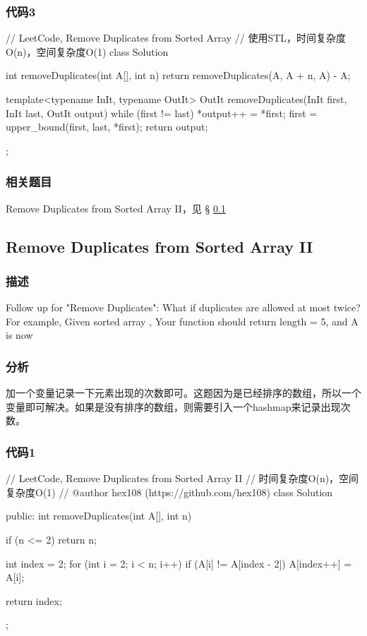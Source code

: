 \subsubsection{代码3}
\begin{Code}
	// LeetCode, Remove Duplicates from Sorted Array
	// 使用STL，时间复杂度O(n)，空间复杂度O(1)
	class Solution {
		int removeDuplicates(int A[], int n) {
			return removeDuplicates(A, A + n, A) - A;
		}
		
		template<typename InIt, typename OutIt>
		OutIt removeDuplicates(InIt first, InIt last, OutIt output) {
			while (first != last) {
				*output++ = *first;
				first = upper_bound(first, last, *first);
			}
			return output;
		}
	};
\end{Code}

\subsubsection{相关题目}

\begindot
\item Remove Duplicates from Sorted Array II，见 \S 
\ref{sec:remove-duplicates-from-sorted-array-ii}
\myenddot


\subsection{Remove Duplicates from Sorted Array II}
\label{sec:remove-duplicates-from-sorted-array-ii}


\subsubsection{描述}
Follow up for "Remove Duplicates":
What if duplicates are allowed at most twice?
For example,
Given sorted array ,
Your function should return length = 5, and A is now \code{[1,1,2,2,3]}

\subsubsection{分析}
加一个变量记录一下元素出现的次数即可。这题因为是已经排序的数组，所以一个变量即可解决。如果是没有排序的数组，则需要引入一个hashmap来记录出现次数。


\subsubsection{代码1}
\begin{Code}
	// LeetCode, Remove Duplicates from Sorted Array II
	// 时间复杂度O(n)，空间复杂度O(1)
	// @author hex108 (https://github.com/hex108)
	class Solution {
		public:
		int removeDuplicates(int A[], int n) {
			if (n <= 2) return n;
			
			int index = 2;
			for (int i = 2; i < n; i++){
				if (A[i] != A[index - 2])
				A[index++] = A[i];
			}
			
			return index;
		}
	};
\end{Code}


